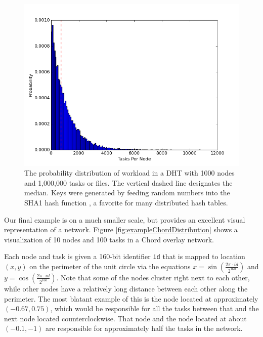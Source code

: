 \documentclass[11pt,conference]{IEEEtran}
\begin{document}
\begin{figure}
	\centering
	\includegraphics[width=0.7\linewidth]{figs/workloadDistribution}
	\caption[Workload Distribution in a DHT]{The probability distribution of workload in a DHT with 1000 nodes and 1,000,000 tasks or files.  The vertical dashed line designates the median.  Keys were generated by feeding random numbers into the SHA1 hash function \cite{sha1}, a favorite for many distributed hash tables.}
	\label{fig:workloadDistribution}
\end{figure}

Our final example is on a much smaller scale, but provides an excellent visual representation of a network.
Figure \ref{fig:exampleChordDistribution} shows a visualization of 10 nodes and 100 tasks in a Chord overlay network.

Each node and task is given a 160-bit identifier \texttt{id} that is mapped to location $ (x,y) $ on the perimeter of the unit circle via the equations $ x = \sin\left( \frac{ 2 \pi \cdot id}{2^{160}} \right)$ and $ y = \cos\left( \frac{ 2 \pi \cdot id}{2^{160}} \right)$. 
Note that some of the nodes cluster right next to each other, while other nodes have a relatively long distance between each other along the perimeter.  
The most blatant example of this is the node located at approximately $(-0.67, 0.75)$, which would be responsible for all the tasks between that and the next node located counterclockwise.
That node and the node located at about $(-0.1, -1)$ are responsible for approximately half the tasks in the network.
\end{document}
